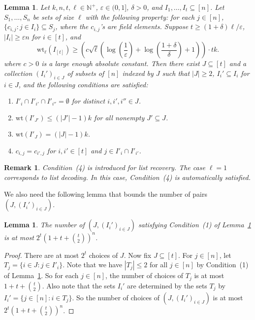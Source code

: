 \documentclass[11pt]{article}
\newtheorem{lemma}[theorem]{Lemma}
\newtheorem{remark}[theorem]{Remark}
\renewcommand{\epsilon}{\varepsilon}
\begin{document}
\begin{lemma}\label{lem_subset}
Let $k,n,t,\ell\in\mathbb{N}^+$, $\epsilon\in (0,1]$, $\delta>0$, and $I_1, \dots, I_t\subseteq [n]$. Let $S_1,\dots, S_n$ be sets of size $\ell$ with the following property: for each $j\in[n]$, $\{c_{i,j}:j\in I_i\}\subseteq S_j$, where the $c_{i,j}$'s are field elements.
Suppose $t\geq (1+\delta)\ell/\epsilon$,
$\left|I_i\right|\geq \epsilon n$ for $i\in [t]$, and
\[
  \mathrm{wt}_\ell(I_{[t]})\geq \left(c\sqrt{\ell}\left(\log\left(\frac{1}{\epsilon}\right)+\log\left( \frac{1+\delta}{\delta }\right)+1\right)\right)\cdot tk.
\]
where $c>0$ is a large enough absolute constant. Then there exist $J\subseteq [t]$ and a collection $(I_i')_{i\in J}$ of subsets of $[n]$ indexed by $J$
such that $|J|\geq 2$, $I_i'\subseteq I_i$ for $i\in J$, and the following conditions are satisfied:
\begin{enumerate}[(1)]
\item $I'_{i}\cap I'_{i'}\cap I'_{i''}=\emptyset$ for distinct  $i,i',i''\in J$.
\item $\mathrm{wt}(I'_{J'})\leq (|J'|-1)k$ for all nonempty $J'\subseteq J$.
\item $\mathrm{wt}(I'_J)=(|J|-1)k$.
\item $c_{i,j}=c_{i',j}$ for $i,i'\in [t]$ and $j\in I'_i\cap I'_{i'}$.
\end{enumerate}
\end{lemma}

\begin{remark}
 Condition~(4) is introduced for  list recovery.
The case $\ell=1$ corresponds to list decoding.
In this case, Condition~(4) is automatically satisfied.
\end{remark}

 We also need the following lemma that bounds the number of  pairs $(J, (I_i')_{i\in J})$.

\begin{lemma}\label{lem_counting}
The number of  $(J, (I_i')_{i\in J})$ satisfying Condition~(1) of Lemma~\ref{lem_subset} is at most $2^t(1+t+\binom{t}{2})^n$.
\end{lemma}
\begin{proof}
There are at most $2^t$ choices of $J$.
Now fix $J\subseteq [t]$.
For $j\in [n]$, let $T_j=\{i\in J: j\in I'_i\}$.
Note that we have $|T_j|\leq 2$ for all $j\in [n]$ by Condition~(1) of Lemma~\ref{lem_subset}.
So for each $j\in [n]$, the number of choices of $T_j$ is at most $1+t+\binom{t}{2}$.
Also note that the sets $I_i'$ are determined by the sets $T_j$ by $I_i'=\{j\in [n]: i\in T_j\}$.
So the number of choices of $(J, (I_i')_{i\in J})$ is at most $2^t(1+t+\binom{t}{2})^n$.
\end{proof}
\end{document}
